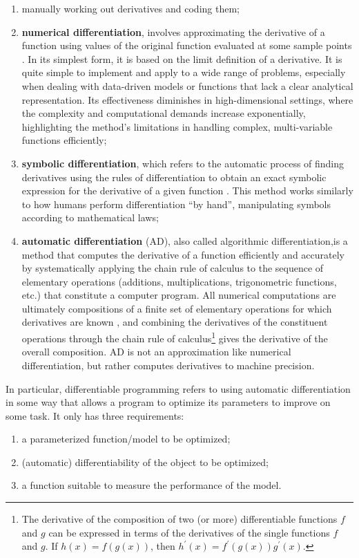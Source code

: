 \begin{enumerate}
    \item manually working out derivatives and coding them;
    \item \textbf{numerical differentiation}, involves approximating the derivative of a function using values of the original function evaluated at some sample points \citep{burden_numerical_2016}. In its simplest form, it is based on the limit definition of a derivative. It is quite simple to implement and apply to a wide range of problems, especially when dealing with data-driven models or functions that lack a clear analytical representation. Its effectiveness diminishes in high-dimensional settings, where the complexity and computational demands increase exponentially, highlighting the method's limitations in handling complex, multi-variable functions efficiently;
    \item \textbf{symbolic differentiation}, which refers to the automatic process of finding derivatives using the rules of differentiation to obtain an exact symbolic expression for the derivative of a given function \citep{grabmeier_computer_2003}. This method works similarly to how humans perform differentiation ``by hand'', manipulating symbols according to mathematical laws;
    \item \textbf{automatic differentiation} (AD), also called algorithmic differentiation,is a method that computes the derivative of a function efficiently and accurately by systematically applying the chain rule of calculus to the sequence of elementary operations (additions, multiplications, trigonometric functions, etc.) that constitute a computer program. All numerical computations are ultimately compositions of a finite set of elementary operations for which derivatives are known \citep{verma_introduction_2000,griewank_evaluating_2008}, and combining the derivatives of the constituent operations through the chain rule of calculus\footnote{The derivative of the composition of two (or more) differentiable functions $f$ and $g$ can be expressed in terms of the derivatives of the single functions $f$ and $g$. If $h (x) = f(g(x))$, then $h^\prime(x) = f^\prime(g(x)) g^\prime(x)$.} gives the derivative of the overall composition. AD is not an approximation like numerical differentiation, but rather computes derivatives to machine precision.
\end{enumerate}
\newpage
In particular, differentiable programming refers to using automatic differentiation in some way that allows a program to optimize its parameters to improve on some task. It only has three requirements:
\begin{enumerate}
    \item a parameterized function/model to be optimized;
    \item (automatic) differentiability of the object to be optimized;
    \item a function suitable to measure the performance of the model.
\end{enumerate}

